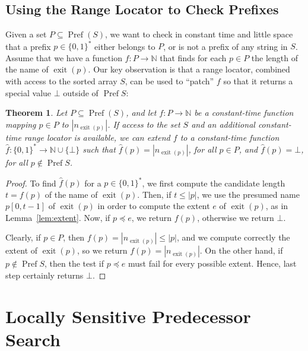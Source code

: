 \documentclass[a4paper,11pt]{article}
\newtheorem{theorem}{Theorem}[section]
\newcommand{\N}{\mathbb{N}}
\newcommand{\?}{\mskip1.5mu}
\DeclareMathOperator{\exit}{exit}
\DeclareMathOperator{\Pref}{Pref}
\begin{document}
\subsection{Using the Range Locator to Check Prefixes}

Given a set $P\subseteq \Pref(S)$, we want to check in constant time
and little space that a prefix $p \in \{0, 1\}^*$ either belongs 
to $P$, or is not a prefix of any string in $S$. Assume that we 
have a function $f : P \rightarrow \N$ that finds for each
$p\in P$ the length of the name of $\exit(p)$. 
Our key observation is that a range locator, combined with access 
to the sorted array $S$, can be used to ``patch''
$f$ so that it returns a special value $\bot$ outside of $\Pref S$:
\begin{theorem}
\label{th:pref}
Let $P \subseteq\Pref(S)$, and let $f: P \rightarrow \N$ be 
a constant-time function mapping $p \in P$ to $|n_{\exit(p)}|$. 
If access to the set $S$ and an additional
constant-time range locator is available, we can extend 
$f$ to a constant-time function $\widehat{f}: \{0, 1\}^* \rightarrow \N
\cup \{ \bot \}$ such that $\widehat{f}(p)=|n_{\exit(p)}|$, for 
all $p \in P$, and $\widehat{f}(p) = \bot$, for
all $p \not\in\Pref S$.
\end{theorem}
\begin{proof}

To find $\widehat{f}(p)$ for a $p \in \{0, 1\}^*$, 
we first compute the candidate length $t = f(p)$ of the name of 
$\exit(p)$. Then, if $t \leq |p|$, we use the presumed
name $p[0, t -1]$ of $\exit(p)$ in order to compute 
the extent $e$ of $\exit(p)$, as in Lemma~\ref{lem:extent}. Now, 
if $p  \preceq e$, we return $f(p)$, otherwise we return $\bot$.

Clearly, if $p\in P$, then $f(p) = |n_{\exit(p)}| \leq |p|$, and we
compute correctly the extent of $\exit(p)$, so we return 
$f(p)=|n_{\exit(p)}|$.
On the other hand, if $p \not\in \Pref S$, then the test if 
$p \preceq e$ must fail for every possible extent. 
Hence, last step certainly returns $\bot$.
\end{proof}


\section{Locally Sensitive Predecessor Search}
\label{sec:pred}
\end{document}
